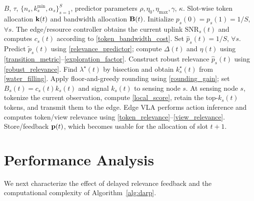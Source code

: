 \documentclass[lettersize,journal]{IEEEtran}
\theoremstyle{custom}
\begin{document}
\begin{algorithm}[t]
\caption{Delayed Action-Relevance-Guided Token Allocation and Pruning}
\label{alg:darp}
\begin{algorithmic}[1]
\REQUIRE $B$, $\tau$, $\{n_s,k_s^{\min},\alpha_s\}_{s=1}^{S}$, predictor parameters $\rho,\eta_0,\eta_{\max},\gamma$, $\kappa$.
\ENSURE Slot-wise token allocation ${\bf k}(t)$ and bandwidth allocation ${\bf B}(t)$.
\STATE Initialize $p_s(0)=p_s(1)=1/S$, $\forall s$.
    \STATE The edge/resource controller obtains the current uplink $\mathrm{SNR}_s(t)$ and computes $c_s(t)$ according to \eqref{token_bandwidth_cost}.
        \STATE Set $\widehat p_s(t)=1/S$, $\forall s$.
    \ELSE
        \STATE Predict $\widetilde p_s(t)$ using \eqref{relevance_predictor}; compute $\Delta(t)$ and $\eta(t)$ using \eqref{transition_metric}--\eqref{exploration_factor}.
        \STATE Construct robust relevance $\widehat p_s(t)$ using \eqref{robust_relevance}.
    \ENDIF
    \STATE Find $\lambda^{\star}(t)$ by bisection and obtain $k_s^{\star}(t)$ from \eqref{water_filling}.
    \STATE Apply floor-and-greedy rounding using \eqref{rounding_gain}; set $B_s(t)=c_s(t)k_s(t)$ and signal $k_s(t)$ to sensing node $s$.
    \STATE At sensing node $s$, tokenize the current observation, compute \eqref{local_score}, retain the top-$k_s(t)$ tokens, and transmit them to the edge.
    \STATE Edge VLA performs action inference and computes token/view relevance using \eqref{token_relevance}--\eqref{view_relevance}.
    \STATE Store/feedback ${\bf p}(t)$, which becomes usable for the allocation of slot $t+1$.
\ENDFOR
\end{algorithmic}
\end{algorithm}

\section{Performance Analysis}
We next characterize the effect of delayed relevance feedback and the computational complexity of Algorithm~\ref{alg:darp}.
\end{document}
